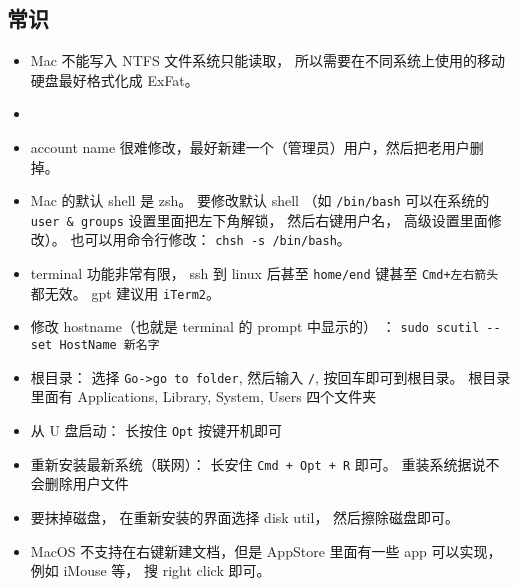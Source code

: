 \subsection{常识}
\begin{itemize}
\item Mac 不能写入 NTFS 文件系统只能读取， 所以需要在不同系统上使用的移动硬盘最好格式化成 ExFat。
\item 
\item account name 很难修改，最好新建一个（管理员）用户，然后把老用户删掉。
\item Mac 的默认 shell 是 zsh。 要修改默认 shell （如 \verb`/bin/bash` 可以在系统的 \verb`user & groups` 设置里面把左下角解锁， 然后右键用户名， 高级设置里面修改）。 也可以用命令行修改： \verb`chsh -s /bin/bash`。
\item terminal 功能非常有限， ssh 到 linux 后甚至 \verb`home/end` 键甚至 \verb`Cmd+左右箭头` 都无效。 gpt 建议用 \verb`iTerm2`。
\item 修改 hostname（也就是 terminal 的 prompt 中显示的） ： \verb`sudo scutil --set HostName 新名字`
\item 根目录： 选择 \verb`Go->go to folder`, 然后输入 \verb`/`, 按回车即可到根目录。 根目录里面有 Applications, Library, System, Users 四个文件夹
\item 从 U 盘启动： 长按住 \verb`Opt` 按键开机即可
\item 重新安装最新系统（联网）： 长安住 \verb`Cmd + Opt + R` 即可。 重装系统据说不会删除用户文件
\item 要抹掉磁盘， 在重新安装的界面选择 disk util， 然后擦除磁盘即可。
\item MacOS 不支持在右键新建文档，但是 AppStore 里面有一些 app 可以实现， 例如 iMouse 等， 搜 right click 即可。
\end{itemize}

